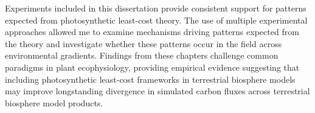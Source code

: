 \documentclass{ttuthes2007}
\begin{document}
Experiments included in this dissertation provide consistent support for patterns expected from photosynthetic least-cost theory. The use of multiple experimental approaches allowed me to examine mechanisms driving patterns expected from the theory and investigate whether these patterns occur in the field across environmental gradients. Findings from these chapters challenge common paradigms in plant ecophysiology, providing empirical evidence suggesting that including photosynthetic least-cost frameworks in terrestrial biosphere models may improve longstanding divergence in simulated carbon fluxes across terrestrial biosphere model products.

\listoftables
\listoffigures

\mainmatter








\end{document}
